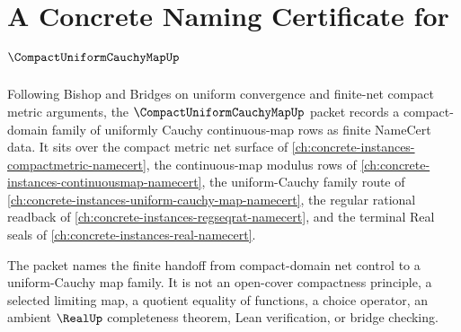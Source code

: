 \chapter{A Concrete Naming Certificate for $\CompactUniformCauchyMapUp$}
\label{ch:concrete-instances-compact-uniform-cauchy-map-namecert}

Following Bishop and Bridges on uniform convergence and finite-net compact metric arguments, the $\CompactUniformCauchyMapUp$ packet records a compact-domain family of uniformly Cauchy continuous-map rows as finite NameCert data. It sits over the compact metric net surface of \autoref{ch:concrete-instances-compactmetric-namecert}, the continuous-map modulus rows of \autoref{ch:concrete-instances-continuousmap-namecert}, the uniform-Cauchy family route of \autoref{ch:concrete-instances-uniform-cauchy-map-namecert}, the regular rational readback of \autoref{ch:concrete-instances-regseqrat-namecert}, and the terminal Real seals of \autoref{ch:concrete-instances-real-namecert}.

The packet names the finite handoff from compact-domain net control to a uniform-Cauchy map family. It is not an open-cover compactness principle, a selected limiting map, a quotient equality of functions, a choice operator, an ambient $\RealUp$ completeness theorem, Lean verification, or bridge checking.

